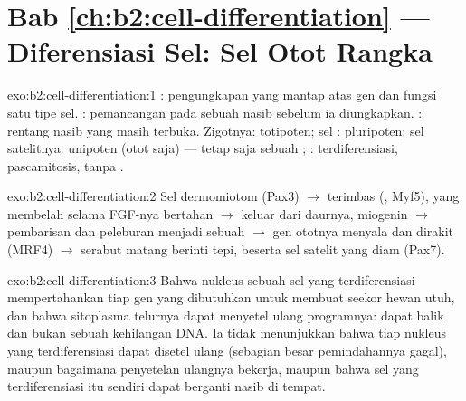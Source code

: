 \section*{Bab \ref{ch:b2:cell-differentiation} --- Diferensiasi Sel: Sel Otot Rangka}

\begin{solution}{exo:b2:cell-differentiation:1}
: pengungkapan yang mantap atas gen dan fungsi satu tipe
sel. : pemancangan pada sebuah nasib sebelum ia
diungkapkan. : rentang nasib yang masih terbuka. Zigotnya:
totipoten; sel : pluripoten; sel satelitnya:
unipoten (otot saja) --- tetap saja sebuah ; :
terdiferensiasi, pascamitosis, tanpa .
\end{solution}

\begin{solution}{exo:b2:cell-differentiation:2}
Sel dermomiotom (Pax3) $\to$  terimbas (, Myf5), yang
membelah selama FGF-nya bertahan $\to$ keluar dari daurnya, miogenin
$\to$ pembarisan dan peleburan menjadi sebuah  $\to$ gen ototnya
menyala dan  dirakit (MRF4) $\to$ serabut matang berinti tepi,
beserta sel satelit yang diam (Pax7).
\end{solution}

\begin{solution}{exo:b2:cell-differentiation:3}
Bahwa nukleus sebuah sel yang terdiferensiasi mempertahankan tiap gen
yang dibutuhkan untuk membuat seekor hewan utuh, dan bahwa sitoplasma
telurnya dapat menyetel ulang programnya:  dapat balik dan
bukan sebuah kehilangan DNA. Ia tidak menunjukkan bahwa tiap nukleus
yang terdiferensiasi dapat disetel ulang (sebagian besar pemindahannya
gagal), maupun bagaimana penyetelan ulangnya bekerja, maupun bahwa sel
yang terdiferensiasi itu sendiri dapat berganti nasib di tempat.
\end{solution}

